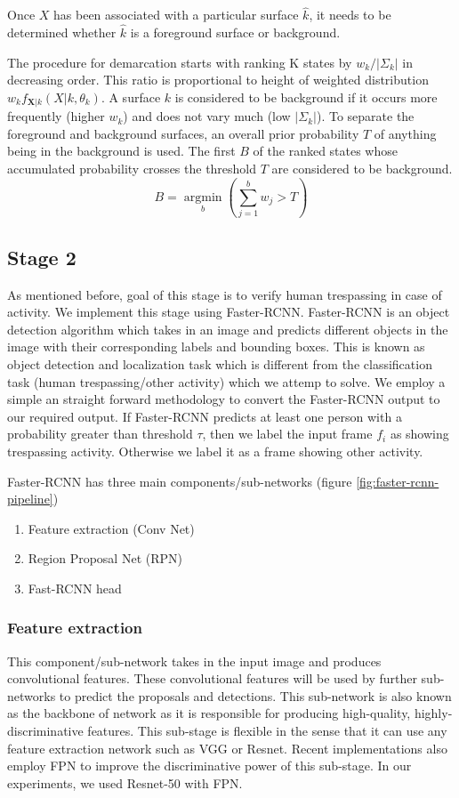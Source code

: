 Once $X$ has been associated with a particular surface $\hat{k}$, it needs to be determined whether $\hat{k}$ is a foreground surface or background. 

The procedure for demarcation starts with ranking K states by $w_k / | \Sigma_k |$ in decreasing order. This ratio is proportional to height of weighted distribution $w_k f_{\mathbf{X}|k}(X|k,\theta_k)$. A surface $k$ is considered to be 
background if it occurs more frequently (higher $w_k$) and does not vary much (low $|\Sigma_k|$).  To separate the foreground and background surfaces, an overall prior probability $T$ of anything being in the background is used. The first $B$ of the ranked  states whose accumulated probability crosses the threshold $T$ are considered to be background. 
$$ B=\operatorname*{argmin}_b (\sum_{j=1}^b w_{j} > T)$$ 

\subsection{Stage 2 }
As mentioned before, goal of this stage is to verify human trespassing in case of activity. We implement this stage using Faster-RCNN\cite{ref_fasterrcnn}. Faster-RCNN is an object detection algorithm which takes in an image and predicts different objects in the image with their corresponding labels and bounding boxes. This is known as object detection and localization task which is different from the classification task (human trespassing/other activity) which we attemp to solve. We employ a simple an straight forward methodology to convert the Faster-RCNN output to our required output. If Faster-RCNN predicts at least one person with a probability greater than threshold $\tau$, then we label the input frame $f_i$ as showing trespassing activity. Otherwise we label it as a frame showing other activity. 

Faster-RCNN has three main components/sub-networks (figure \ref{fig:faster-rcnn-pipeline})
\begin{enumerate}
    \item Feature extraction (Conv Net)
    \item Region Proposal Net (RPN)
    \item Fast-RCNN head
\end{enumerate}

\subsubsection{Feature extraction}
This component/sub-network takes in the input image and produces convolutional features. These convolutional features will be used by further sub-networks to predict the proposals and detections. This sub-network is also known as the backbone of network as it is responsible for producing high-quality, highly-discriminative features. This sub-stage is flexible in the sense that it can use any feature extraction network such as VGG or Resnet. Recent implementations also employ FPN\cite{lin2017feature} to improve the discriminative power of this sub-stage. In our experiments, we used Resnet-50 with FPN. 

